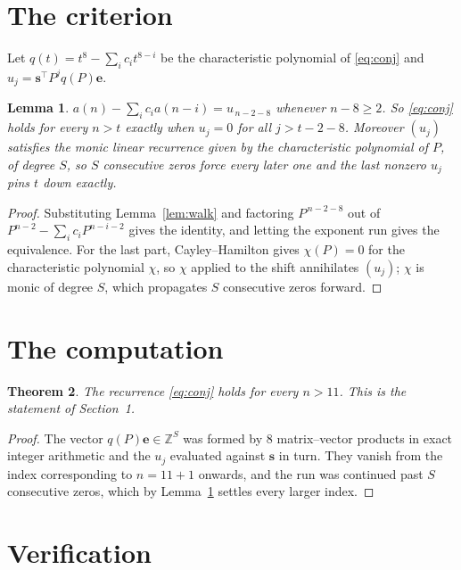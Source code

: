 \documentclass[11pt,a4paper]{article}
\theoremstyle{plain}
\newtheorem{theorem}{Theorem}
\newtheorem{lemma}[theorem]{Lemma}
\theoremstyle{definition}
\begin{document}
\section{The criterion}

Let $q(t)=t^{8}-\sum_i c_i t^{8-i}$ be the characteristic polynomial of
\eqref{eq:conj} and $u_j=\mathbf{s}^{\!\top}P^{j}q(P)\mathbf{e}$.

\begin{lemma}\label{lem:crit}
$a(n)-\sum_i c_i a(n-i)=u_{\,n-2-8}$ whenever $n-8\ge2$. So \eqref{eq:conj}
holds for every $n>t$ exactly when $u_j=0$ for all $j>t-2-8$. Moreover $(u_j)$
satisfies the monic linear recurrence given by the characteristic polynomial of $P$, of
degree $S$, so $S$ consecutive zeros force every later one and the last nonzero $u_j$ pins
$t$ down exactly.
\end{lemma}

\begin{proof}
Substituting Lemma~\ref{lem:walk} and factoring $P^{\,n-2-8}$ out of
$P^{n-2}-\sum_i c_i P^{n-i-2}$ gives the identity, and letting the exponent run gives the
equivalence. For the last part, Cayley--Hamilton gives $\chi(P)=0$ for the characteristic
polynomial $\chi$, so $\chi$ applied to the shift annihilates $(u_j)$; $\chi$ is monic of
degree $S$, which propagates $S$ consecutive zeros forward.
\end{proof}

\section{The computation}

\begin{theorem}
The recurrence \eqref{eq:conj} holds for every $n>11$. This is the statement of
Section~1.
\end{theorem}

\begin{proof}
The vector $q(P)\mathbf{e}\in\mathbb{Z}^{S}$ was formed by $8$ matrix--vector
products in exact integer arithmetic and the $u_j$ evaluated against $\mathbf{s}$ in turn.
They vanish from the index corresponding to $n=11+1$ onwards, and the run was continued
past $S$ consecutive zeros, which by Lemma~\ref{lem:crit} settles every larger index.
\end{proof}

\section{Verification}
\end{document}

